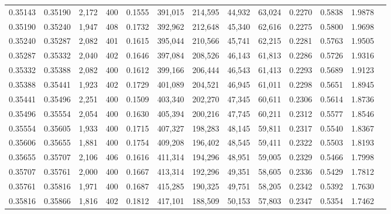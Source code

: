 \begin{tabular}{rrrrrrrrrrrrr}
0.35143 & 0.35190 &  2,172 & 400 &                                     0.1555 & 391,015 & 214,595 &  44,932 &  63,024 & 0.2270 & 0.5838 & 1.9878 \\
0.35190 & 0.35240 &  1,947 & 408 &                                     0.1732 & 392,962 & 212,648 &  45,340 &  62,616 & 0.2275 & 0.5800 & 1.9698 \\
0.35240 & 0.35287 &  2,082 & 401 &                                     0.1615 & 395,044 & 210,566 &  45,741 &  62,215 & 0.2281 & 0.5763 & 1.9505 \\
0.35287 & 0.35332 &  2,040 & 402 &                                     0.1646 & 397,084 & 208,526 &  46,143 &  61,813 & 0.2286 & 0.5726 & 1.9316 \\
0.35332 & 0.35388 &  2,082 & 400 &                                     0.1612 & 399,166 & 206,444 &  46,543 &  61,413 & 0.2293 & 0.5689 & 1.9123 \\
0.35388 & 0.35441 &  1,923 & 402 &                                     0.1729 & 401,089 & 204,521 &  46,945 &  61,011 & 0.2298 & 0.5651 & 1.8945 \\
0.35441 & 0.35496 &  2,251 & 400 &                                     0.1509 & 403,340 & 202,270 &  47,345 &  60,611 & 0.2306 & 0.5614 & 1.8736 \\
0.35496 & 0.35554 &  2,054 & 400 &                                     0.1630 & 405,394 & 200,216 &  47,745 &  60,211 & 0.2312 & 0.5577 & 1.8546 \\
0.35554 & 0.35605 &  1,933 & 400 &                                     0.1715 & 407,327 & 198,283 &  48,145 &  59,811 & 0.2317 & 0.5540 & 1.8367 \\
0.35606 & 0.35655 &  1,881 & 400 &                                     0.1754 & 409,208 & 196,402 &  48,545 &  59,411 & 0.2322 & 0.5503 & 1.8193 \\
0.35655 & 0.35707 &  2,106 & 406 &                                     0.1616 & 411,314 & 194,296 &  48,951 &  59,005 & 0.2329 & 0.5466 & 1.7998 \\
0.35707 & 0.35761 &  2,000 & 400 &                                     0.1667 & 413,314 & 192,296 &  49,351 &  58,605 & 0.2336 & 0.5429 & 1.7812 \\
0.35761 & 0.35816 &  1,971 & 400 &                                     0.1687 & 415,285 & 190,325 &  49,751 &  58,205 & 0.2342 & 0.5392 & 1.7630 \\
0.35816 & 0.35866 &  1,816 & 402 &                                     0.1812 & 417,101 & 188,509 &  50,153 &  57,803 & 0.2347 & 0.5354 & 1.7462 \\

\end{tabular}
